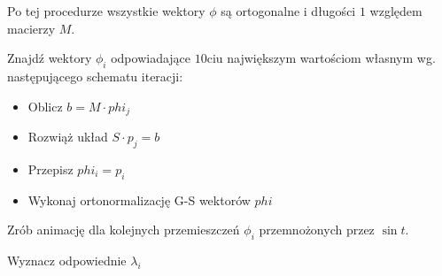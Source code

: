 \documentclass{instrukcja}
\begin{document}
\\
\vspace{1cm}\\
Po tej procedurze wszystkie wektory $\phi$ są ortogonalne i długości $1$ względem macierzy $M$.

\begin{zad}
Znajdź wektory $\phi_i$ odpowiadające $10$ciu największym wartościom własnym wg. następującego schematu iteracji:
\begin{itemize}
\item Oblicz $b = M\cdot phi_j$
\item Rozwiąż układ $S\cdot p_j = b$
\item Przepisz $phi_i = p_i$
\item Wykonaj ortonormalizację G-S wektorów $phi$
\end{itemize}
\end{zad}

\begin{zad}
Zrób animację dla kolejnych przemieszczeń $\phi_i$ przemnożonych przez $\sin{t}$.
\end{zad}

\begin{zad}
Wyznacz odpowiednie $\lambda_i$
\end{zad}
\end{document}
